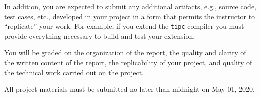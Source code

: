 \documentclass[12pt,letterpaper]{article}
\begin{document}
In addition, you are expected to submit any additional artifacts,
e.g., source code, test cases, etc., developed in your project
in a form that permits the instructor to ``replicate'' your work.
For example, if you extend the \texttt{tipc} compiler you must
provide everything necessary to build and test your extension.

You will be graded on the organization of the report,
the quality and clarity of the written content of the report,
the replicability of your project,
and quality of the technical work carried out on the project.

All project materials must be submitted no later than midnight on
May 01, 2020.
\end{document}
